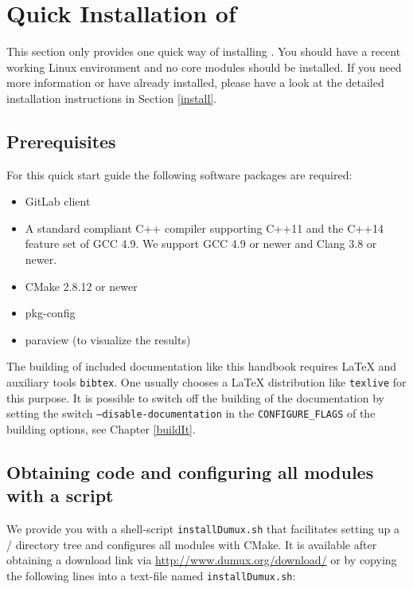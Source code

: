 \section{Quick Installation of \Dumux}
\label{quick-install}

This section only provides one quick way of installing \Dumux.
You should have a recent working Linux environment and no \Dune core modules should be installed.
If you need more information or
have \Dune already installed, please have a look at the detailed installation
instructions in Section \ref{install}.

\subsection{Prerequisites} \label{sec:prerequisites}
For this quick start guide the following software packages are required:
\begin{itemize}
\item GitLab client
\item A standard compliant C++ compiler supporting C++11 and the C++14 feature set of GCC 4.9. We support GCC 4.9 or newer and Clang 3.8 or newer.
\item CMake 2.8.12 or newer
\item pkg-config
\item paraview (to visualize the results)
\end{itemize}

The building of included documentation like this handbook requires \LaTeX{} and auxiliary tools
\texttt{bibtex}. One usually chooses a \LaTeX{} distribution like \texttt{texlive} for this purpose.
It is possible to switch off the building of the documentation by setting the switch \texttt{--disable-documentation}
in the \texttt{CONFIGURE\_FLAGS} of the building options, see Chapter \ref{buildIt}.

\subsection{Obtaining code and configuring all modules with a script}
We provide you with a shell-script \texttt{installDumux.sh} that facilitates setting up a {\Dune}/{\Dumux} directory tree
and configures all modules with CMake.
It is available after obtaining a download link via \url{http://www.dumux.org/download/} or
by copying the following lines into a text-file named \texttt{installDumux.sh}:


